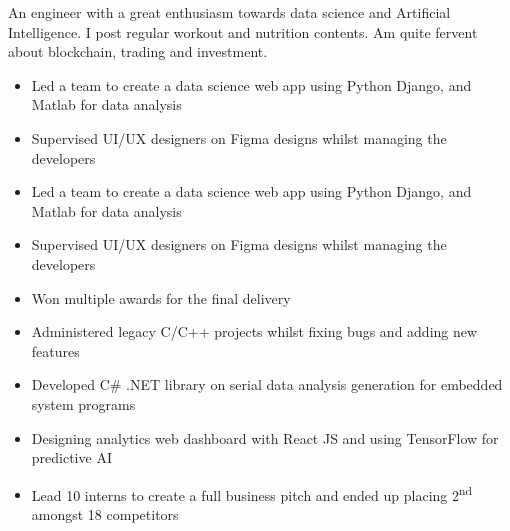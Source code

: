 \documentclass[11pt,a4paper,ragged2e]{altacv}
\begin{document}
\begin{paracol}{1}
\smallskip
{}

An engineer with a great enthusiasm towards data science and Artificial Intelligence. I post regular workout and nutrition contents. Am quite fervent about blockchain, trading and investment. \smallskip


\begin{itemize}
\item Led a team to create a data science web app using Python Django, and Matlab for data analysis
\item Supervised UI/UX designers on Figma designs whilst managing the developers
\end{itemize}
\tightdivider


\begin{itemize}
\item Led a team to create a data science web app using Python Django, and Matlab for data analysis
\item Supervised UI/UX designers on Figma designs whilst managing the developers
\item Won multiple awards for the final delivery
\end{itemize}
\tightdivider

\begin{itemize}
\item Administered legacy C/C++ projects whilst fixing bugs and adding new features
\item Developed C\# .NET library on serial data analysis generation for embedded system programs
\item Designing analytics web dashboard with React JS and using TensorFlow for predictive AI 
\item Lead 10 interns to create a full business pitch and ended up placing  2\textsuperscript{nd} amongst 18 competitors
\end{itemize}
\tightdivider


\end{paracol}
\end{document}
